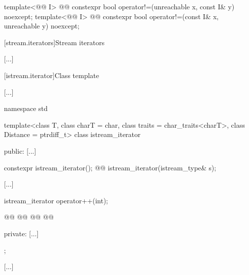 \begin{addedblock}
\begin{itemdescr}
\pnum
{}

\end{itemdescr}

%
%
\begin{itemdecl}
template<@@ I>
  @@ constexpr bool operator!=(unreachable x, const I& y) noexcept;
template<@@ I>
  @@ constexpr bool operator!=(const I& x, unreachable y) noexcept;
\end{itemdecl}

\begin{itemdescr}
\pnum
{}

\end{itemdescr}
\end{addedblock}


[stream.iterators]{Stream iterators}

[...]

[istream.iterator]{Class template }

[...]

\begin{codeblock}
namespace std {
  template<class T, class charT = char, class traits = char_traits<charT>,
           class Distance = ptrdiff_t>
  class istream_iterator {
  public:
    [...]

    constexpr istream_iterator();
    @@
    istream_iterator(istream_type& s);

    [...]

    istream_iterator  operator++(int);

    @@
    @@
    @@
    @@

  private:
    [...]
  };

  [...]
}
\end{codeblock}

